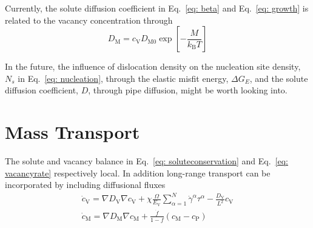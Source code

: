 \documentclass[11pt]{scrartcl}
\newcommand{\eref}[1]{Eq.~\eqref{#1}}
\newcommand{\kB}{\ensuremath{k_\text{B}}}
\begin{document}
Currently, the solute diffusion coefficient in \eref{eq: beta} and \eref{eq: growth} is related to the vacancy concentration through
%
\begin{equation}
\label{eq: diffusion}
D_\text{M} = c_\text{V} D_\text{M0} \exp\left[-\frac{M}{\kB T}\right]
\end{equation} 
%

In the future, the influence of dislocation density on the nucleation site density, $N_s$ in \eref{eq: nucleation}, through the elastic misfit energy, $\Delta G_E$, and the solute diffusion coefficient, $D$, through pipe diffusion, might be worth looking into.

\section{Mass Transport}

The solute and vacancy balance in \eref{eq: soluteconservation} and \eref{eq: vacancyrate} respectively local.
In addition long-range transport can be incorporated by including diffusional fluxes
%
\begin{align}
\label{eq: diffusion}
\dot{c}_\text{V} = \nabla D_\text{V} \nabla c_\text{V} + \chi \frac{\Omega}{E_\text{V}} \sum_{\alpha = 1}^{N} \dot{\gamma}^{\alpha} \tau^{\alpha} - \frac{D_\text{V}}{L^2} c_\text{V} \\
\dot{c}_\text{M} = \nabla D_\text{M} \nabla c_\text{M} + \frac{\dot{f}}{1-f}\left(c_\text{M} - c_\text{P}\right)
\end{align} 
%




\end{document}
